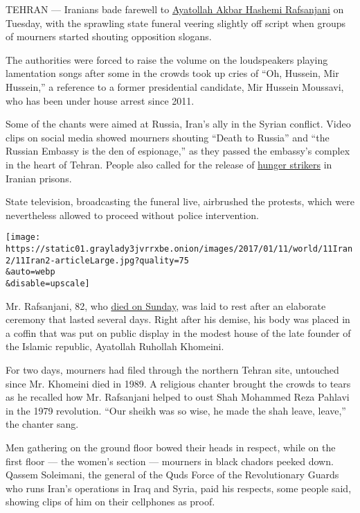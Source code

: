 TEHRAN --- Iranians bade farewell to
\href{http://www.nytimes3xbfgragh.onion/2017/01/08/world/middleeast/ayatollah-rafsanjani-dead.html}{Ayatollah
Akbar Hashemi Rafsanjani} on Tuesday, with the sprawling state funeral
veering slightly off script when groups of mourners started shouting
opposition slogans.

The authorities were forced to raise the volume on the loudspeakers
playing lamentation songs after some in the crowds took up cries of
``Oh, Hussein, Mir Hussein,'' a reference to a former presidential
candidate, Mir Hussein Moussavi, who has been under house arrest since
2011.

Some of the chants were aimed at Russia, Iran's ally in the Syrian
conflict. Video clips on social media showed mourners shouting ``Death
to Russia'' and ``the Russian Embassy is the den of espionage,'' as they
passed the embassy's complex in the heart of Tehran. People also called
for the release of
\href{http://www.nytimes3xbfgragh.onion/2017/01/09/world/middleeast/the-hunger-strike-the-protest-tactic-of-gandhi-is-vexing-irans-penal-overseers.html?ref=world}{hunger
strikers} in Iranian prisons.

State television, broadcasting the funeral live, airbrushed the
protests, which were nevertheless allowed to proceed without police
intervention.

\texttt{[image: https://static01.graylady3jvrrxbe.onion/images/2017/01/11/world/11Iran2/11Iran2-articleLarge.jpg?quality=75\\\&auto=webp\\\&disable=upscale]}

Mr. Rafsanjani, 82, who
\href{http://www.nytimes3xbfgragh.onion/2017/01/08/world/middleeast/iran-ali-akbar-hashemi-rafsanjani-dies.html}{died
on Sunday}, was laid to rest after an elaborate ceremony that lasted
several days. Right after his demise, his body was placed in a coffin
that was put on public display in the modest house of the late founder
of the Islamic republic, Ayatollah Ruhollah Khomeini.

For two days, mourners had filed through the northern Tehran site,
untouched since Mr. Khomeini died in 1989. A religious chanter brought
the crowds to tears as he recalled how Mr. Rafsanjani helped to oust
Shah Mohammed Reza Pahlavi in the 1979 revolution. ``Our sheikh was so
wise, he made the shah leave, leave,'' the chanter sang.

Men gathering on the ground floor bowed their heads in respect, while on
the first floor --- the women's section --- mourners in black chadors
peeked down. Qassem Soleimani, the general of the Quds Force of the
Revolutionary Guards who runs Iran's operations in Iraq and Syria, paid
his respects, some people said, showing clips of him on their cellphones
as proof.

